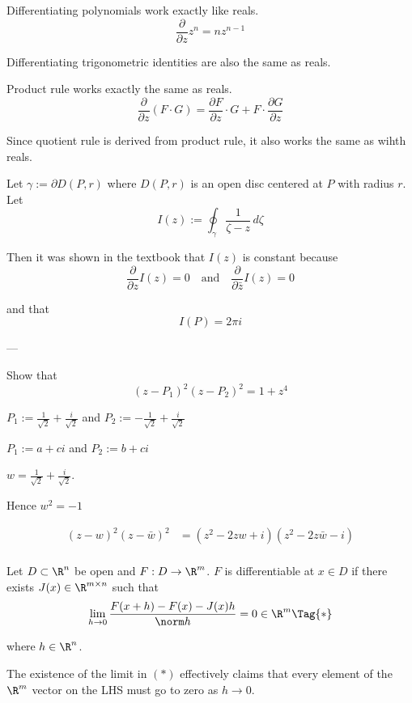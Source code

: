\def\pp#1#2{\frac{\partial #1}{\partial #2}}

\label{f107aed}

Differentiating polynomials work exactly like reals.
$$
  \pp{}z z^n=nz^{n-1}
$$

Differentiating trigonometric identities are also the same as reals.

Product rule works exactly the same as reals.
$$
  \pp{}z(F\cdot G)=\pp Fz\cdot G+F\cdot\pp Gz
$$

Since quotient rule is derived from product rule, it also works the same as
wihth reals.

\label{fbc836e}

Let $\gamma:=\partial D(P,r)$ where $D(P,r)$ is an open disc centered at $P$
with radius $r$. Let
$$
  I(z):=\oint_\gamma\frac1{\zeta-z}\,d\zeta
$$

Then it was shown in the textbook that $I(z)$ is constant because
$$
  \pp{}zI(z)=0\quad\text{and}\quad\pp{}{\bar z}I(z)=0
$$

and that
$$
  I(P)=2\pi i
$$

---

Show that
$$
  (z-P_1)^2(z-P_2)^2=1+z^4
$$

$P_1:=\frac1{\sqrt2}+\frac i{\sqrt2}$ and $P_2:=-\frac1{\sqrt2}+\frac i{\sqrt2}$

$P_1:=a+ci$ and $P_2:=b+ci$

$w=\frac1{\sqrt2}+\frac i{\sqrt2}$.

Hence $w^2=-1$

\begin{align*}
  (z-w)^2(z-\bar w)^2
   &= (z^2-2zw+i)(z^2-2z\bar w-i) \\
\end{align*}

\newpage
{}\label{bcd0aa1}

Let $D\subset\R^n$ be open and $F:D\to\R^m$. $F$ is differentiable at $x\in D$
if there exists $J(x)\in\R^{m\times n}$ such that
\begin{equation*}
  \lim_{h\to0}\frac{F(x+h)-F(x)-J(x)h}{\norm h}=0\in\R^m\Tag{*}
\end{equation*}

where $h\in\R^n$.

The existence of the limit in $(*)$ effectively claims that every element of
the $\R^m$ vector on the LHS must go to zero as $h\to0$.

